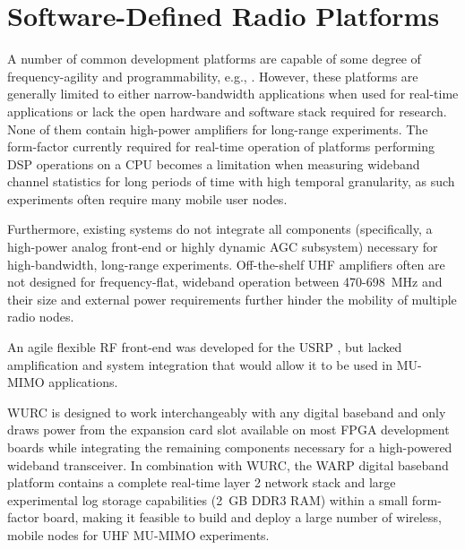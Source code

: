 
\section{Software-Defined Radio Platforms}
\label{sec_related_sdr}

	A number of common development platforms are capable of some degree of frequency-agility and programmability, e.g., \cite{yan2008spectrum, tan2011sora, nguyen2015leveraging}.
	However, these platforms are generally limited to either narrow-bandwidth applications when used for real-time applications or lack the open hardware and software stack required for research. None of them contain high-power amplifiers for long-range experiments.
	The form-factor currently required for real-time operation of platforms performing \ac{DSP} operations on a \ac{CPU} \cite{yan2008spectrum, tan2011sora} becomes a limitation when measuring wideband channel statistics for long periods of time with high temporal granularity, as such experiments often require many mobile user nodes.

	Furthermore, existing systems do not integrate all components (specifically, a high-power analog front-end or highly dynamic \ac{AGC} subsystem) necessary for high-bandwidth, long-range experiments.
	Off-the-shelf UHF amplifiers often are not designed for frequency-flat, wideband operation between 470-698~MHz and their size and external power requirements further hinder the mobility of multiple radio nodes.
	
	An agile flexible RF front-end was developed for the USRP \cite{hasan2010wideband}, but lacked amplification and system integration that would allow it to be used in \ac{MU-MIMO} applications.

	\ac{WURC} is designed to work interchangeably with any digital baseband and only draws power from the expansion card slot available on most FPGA development boards while integrating the remaining components necessary for a high-powered wideband transceiver.
	In combination with \ac{WURC}, the \ac{WARP} digital baseband platform contains a complete real-time layer 2 network stack and large experimental log storage capabilities (2~GB DDR3 RAM) within a small form-factor board, making it feasible to build and deploy a large number of wireless, mobile nodes for UHF \ac{MU-MIMO} experiments.
	
